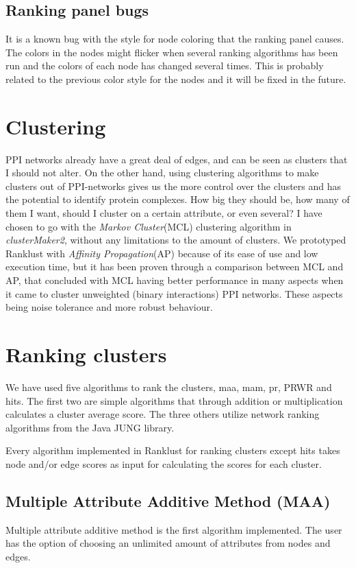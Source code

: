 \subsection{Ranking panel bugs}
It is a known bug with the style for node coloring that the ranking panel
causes. The colors in the nodes might flicker when several ranking algorithms
has been run and the colors of each node has changed several times. This is
probably related to the previous color style for the nodes and it will be fixed
in the future.

\section{Clustering}
PPI networks already have a great deal of edges, and can be seen as clusters
that I should not alter. On the other hand, using clustering algorithms to make
clusters out of PPI-networks gives us the more control over the clusters and has
the potential to identify protein complexes\cite{ap-vs-mcl}. How big they should
be, how many of them I want, should I cluster on a certain attribute, or even
several? I have chosen to go with the \textit{Markov Cluster}(MCL)\cite{mcl}
clustering algorithm in \textit{clusterMaker2}, without any limitations to the
amount of clusters. We prototyped Ranklust with \textit{Affinity
Propagation}(AP)\cite{affinity-propagation} because of its ease of use and low
execution time, but it has been proven through a comparison between MCL and AP,
that concluded with MCL having better performance in many aspects when it came
to cluster unweighted (binary interactions) PPI networks\cite{ap-vs-mcl}. These
aspects being noise tolerance and more robust behaviour.

\section{Ranking clusters}
We have used five algorithms to rank the clusters, \gls{maa}, \gls{mam}, \gls{pr}, PRWR and \gls{hits}.
The first two are simple algorithms that through addition or multiplication
calculates a cluster average score. The three others utilize network ranking
algorithms from the Java JUNG\cite{jung} library.

Every algorithm implemented in Ranklust for ranking clusters except \gls{hits} takes
node and/or edge scores as input for calculating the scores for each cluster.

\subsection{Multiple Attribute Additive Method (MAA)}
Multiple attribute additive method is the first algorithm implemented.  The user
has the option of choosing an unlimited amount of attributes from nodes and
edges.

